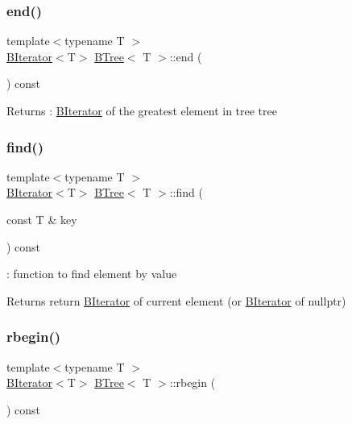 \subsubsection{\texorpdfstring{end()}{end()}}
{\footnotesize\ttfamily template$<$typename T $>$ \\
\hyperlink{classBIterator}{B\+Iterator}$<$T$>$ \hyperlink{classBTree}{B\+Tree}$<$ T $>$\+::end (\begin{DoxyParamCaption}{ }\end{DoxyParamCaption}) const\hspace{0.3cm}{\ttfamily [noexcept]}}

\begin{DoxyReturn}{Returns}
\+: \hyperlink{classBIterator}{B\+Iterator} of the greatest element in tree tree 
\end{DoxyReturn}
\mbox{\label{classBTree_ac0fac7271e38a543aff042db79be9c36}} 
\subsubsection{\texorpdfstring{find()}{find()}}
{\footnotesize\ttfamily template$<$typename T $>$ \\
\hyperlink{classBIterator}{B\+Iterator}$<$T$>$ \hyperlink{classBTree}{B\+Tree}$<$ T $>$\+::find (\begin{DoxyParamCaption}\item[{const T \&}]{key }\end{DoxyParamCaption}) const\hspace{0.3cm}{\ttfamily [noexcept]}}



\+: function to find element by value 

\begin{DoxyReturn}{Returns}
return \hyperlink{classBIterator}{B\+Iterator} of current element (or \hyperlink{classBIterator}{B\+Iterator} of nullptr) 
\end{DoxyReturn}
\mbox{\label{classBTree_a3a24bc55b80013d9fcd57d5589aad413}} 
\subsubsection{\texorpdfstring{rbegin()}{rbegin()}}
{\footnotesize\ttfamily template$<$typename T $>$ \\
\hyperlink{classBIterator}{B\+Iterator}$<$T$>$ \hyperlink{classBTree}{B\+Tree}$<$ T $>$\+::rbegin (\begin{DoxyParamCaption}{ }\end{DoxyParamCaption}) const\hspace{0.3cm}{\ttfamily [noexcept]}}

